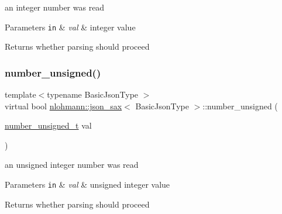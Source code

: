 an integer number was read 


\begin{DoxyParams}[1]{Parameters}
\mbox{\tt in}  & {\em val} & integer value \\
\hline
\end{DoxyParams}
\begin{DoxyReturn}{Returns}
whether parsing should proceed 
\end{DoxyReturn}
\mbox{\label{structnlohmann_1_1json__sax_ad9b253083e0509923ba195136f49face}} 
\subsubsection{\texorpdfstring{number\+\_\+unsigned()}{number\_unsigned()}}
{\footnotesize\ttfamily template$<$typename Basic\+Json\+Type $>$ \\
virtual bool \hyperlink{structnlohmann_1_1json__sax}{nlohmann\+::json\+\_\+sax}$<$ Basic\+Json\+Type $>$\+::number\+\_\+unsigned (\begin{DoxyParamCaption}\item[{\hyperlink{structnlohmann_1_1json__sax_a32028cc056ae0f43aaae331cdbbbf856}{number\+\_\+unsigned\+\_\+t}}]{val }\end{DoxyParamCaption})\hspace{0.3cm}{\ttfamily [pure virtual]}}



an unsigned integer number was read 


\begin{DoxyParams}[1]{Parameters}
\mbox{\tt in}  & {\em val} & unsigned integer value \\
\hline
\end{DoxyParams}
\begin{DoxyReturn}{Returns}
whether parsing should proceed 
\end{DoxyReturn}
\mbox{\label{structnlohmann_1_1json__sax_a60287e3bd85f489e04c83f7e3b76e613}} 

